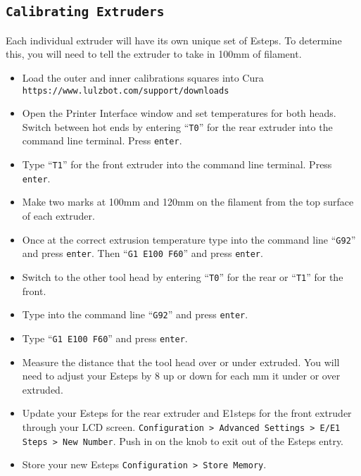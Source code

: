 \subsection{\texttt{Calibrating Extruders}}
Each individual extruder will have its own unique set of Esteps. To determine this, you will need to tell the extruder to take in 100mm of filament.
\begin{itemize}
\item Load the outer and inner calibrations squares into Cura \texttt{https://www.lulzbot.com/support/downloads}
\item Open the Printer Interface window and set temperatures for both heads. Switch between hot ends by entering ``\texttt{T0}'' for the rear extruder into the command line terminal. Press \texttt{enter}.
\item Type ``\texttt{T1}'' for the front extruder into the command line terminal. Press \texttt{enter}.
\item Make two marks at 100mm and 120mm on the filament from the top surface of each extruder.
\item Once at the correct extrusion temperature type into the command line ``\texttt{G92}'' and press \texttt{enter}. Then ``\texttt{G1 E100 F60}'' and press \texttt{enter}.
\item Switch to the other tool head by entering ``\texttt{T0}'' for the rear or ``\texttt{T1}'' for the front. 
\item Type into the command line ``\texttt{G92}'' and press \texttt{enter}.
\item Type ``\texttt{G1 E100 F60}'' and press \texttt{enter}.
\item Measure the distance that the tool head over or under extruded. You will need to adjust your Esteps by 8 up or down for each mm it under or over extruded.
\item Update your Esteps for the rear extruder and E1steps for the front extruder through your LCD screen. \texttt{Configuration > Advanced Settings > E/E1 Steps > New Number}. Push in on the knob to exit out of the Esteps entry.
\item Store your new Esteps \texttt{Configuration > Store Memory}.
\end{itemize}

